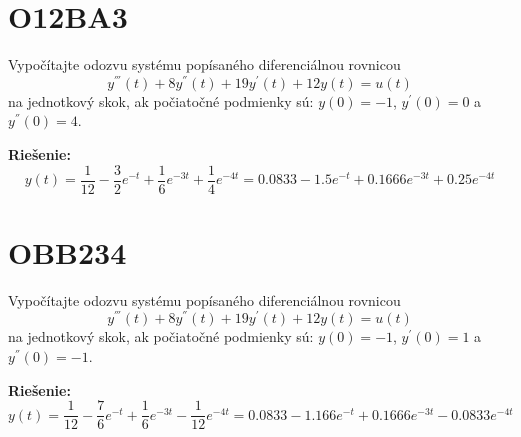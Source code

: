 \documentclass[a4paper, 12pt]{article}
\newenvironment{responsetask}{}{}
\newenvironment{solution}{\noindent\textbf{Riešenie:}}{}
\begin{document}
\section*{O12BA3}
\begin{responsetask}
    Vypočítajte odozvu systému popísaného diferenciálnou rovnicou 
    \begin{equation*}
        y^{'''}(t)+8y^{''}(t)+19y^{'}(t)+12y(t)=u(t)
    \end{equation*}
    na jednotkový skok, ak počiatočné podmienky sú:
    $y(0)=-1$, $y^{'}(0)=0$ a $y^{''}(0)=4$.    
\end{responsetask} 

\begin{solution}
    \begin{equation*}
        y(t)=\dfrac{1}{12} - \dfrac{3}{2}e^{-t} + \dfrac{1}{6}e^{-3t} + \dfrac{1}{4}e^{-4t} = 0.0833 -1.5 e^{-t} + 0.1666 e^{-3t} + 0.25 e^{-4t}
    \end{equation*}
\end{solution}


\section*{OBB234}
\begin{responsetask}
    Vypočítajte odozvu systému popísaného diferenciálnou rovnicou 
    \begin{equation*}
        y^{'''}(t)+8y^{''}(t)+19y^{'}(t)+12y(t)=u(t)
    \end{equation*}
    na jednotkový skok, ak počiatočné podmienky sú:
    $y(0)=-1$, $y^{'}(0)=1$ a $y^{''}(0)=-1$.    
\end{responsetask} 

\begin{solution}
    \begin{equation*}
        y(t)=\dfrac{1}{12} - \dfrac{7}{6}e^{-t} + \dfrac{1}{6}e^{-3t} - \dfrac{1}{12}e^{-4t} = 0.0833 -1.166 e^{-t} + 0.1666 e^{-3t} - 0.0833 e^{-4t}
    \end{equation*}
\end{solution}
\end{document}
